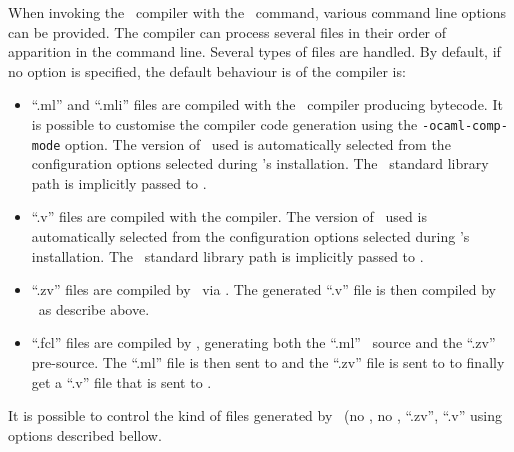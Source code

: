 

\label{compiler-options}
When invoking the \focal\ compiler with the \focalizec\ command,
various command line options can be provided. The compiler can process
several files in their order of apparition in the command line.
Several types of files are handled. By default, if no option is
specified, the default behaviour is of the compiler is:
\begin{itemize}
  \item ``.ml'' and ``.mli'' files are compiled with the \ocaml\
    compiler producing bytecode. It is possible to customise the
    compiler code generation using the {\tt -ocaml-comp-mode} option.
    The version of \ocaml\ used is automatically selected from the
    configuration options selected during \focal's
    installation. The \focal\ standard library path is implicitly
    passed to \ocaml.
    \item ``.v'' files are compiled with the \coq compiler. The
      version of \coq\ used is automatically selected from the
      configuration options selected during \focal's installation.
      The \focal\ standard library path is implicitly passed to
      \coq.
    \item ``.zv'' files are compiled by \zenon\ via \zvtov. The
      generated ``.v'' file is then compiled by \coq\ as describe
      above.
    \item ``.fcl'' files are compiled by \focalizec, generating both
      the ``.ml'' \ocaml\ source and the ``.zv'' pre-\coq source. The
      ``.ml'' file is then sent to \ocaml and the ``.zv'' file is sent
      to \zenon to finally get a ``.v'' file that is sent to \coq.
\end{itemize}
It is possible to control the kind of files generated by
\focalizec\ (no \coq, no \ocaml, ``.zv'', ``.v'' using options
described bellow.

